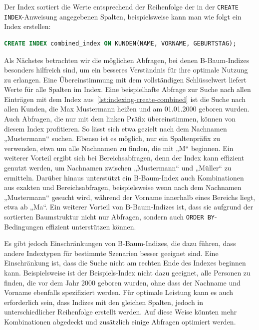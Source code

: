 Der Index sortiert die Werte entsprechend der Reihenfolge der in der \texttt{CREATE INDEX}-Anweisung angegebenen Spalten, beispielsweise kann man wie folgt ein Index erstellen:

\vspace{-5pt}
\begin{lstlisting}[language=SQL,caption=B-Baum-Index bestehend aus mehreren Attributen,label={lst:indexing-create-combined}]
CREATE INDEX combined_index ON KUNDEN(NAME, VORNAME, GEBURTSTAG);
\end{lstlisting}
\vspace{-8pt}

Als Nächstes betrachten wir die möglichen Abfragen, bei denen B-Baum-Indizes besonders hilfreich sind, um ein besseres Verständnis für ihre optimale Nutzung zu erlangen.
Eine Übereinstimmung mit dem vollständigen Schlüsselwert liefert Werte für alle Spalten im Index.
Eine beispielhafte Abfrage zur Suche nach allen Einträgen mit dem Index aus~\ref{lst:indexing-create-combined} ist die Suche nach allen Kunden, die Max Mustermann heißen und am 01.01.2000 geboren wurden.
Auch Abfragen, die nur mit dem linken Präfix übereinstimmen, können von diesem Index profitieren.
So lässt sich etwa gezielt nach dem Nachnamen „Mustermann“ suchen.
Ebenso ist es möglich, nur ein Spaltenpräfix zu verwenden, etwa um alle Nachnamen zu finden, die mit „M“ beginnen.
Ein weiterer Vorteil ergibt sich bei Bereichsabfragen, denn der Index kann effizient genutzt werden, um Nachnamen zwischen „Mustermann“ und „Müller“ zu ermitteln.
Darüber hinaus unterstützt ein B-Baum-Index auch Kombinationen aus exakten und Bereichsabfragen, beispielsweise wenn nach dem Nachnamen „Mustermann“ gesucht wird, während der Vorname innerhalb eines Bereichs liegt, etwa ab „Ma“.
Ein weiterer Vorteil von B-Baum-Indizes ist, dass sie aufgrund der sortierten Baumstruktur nicht nur Abfragen, sondern auch \texttt{ORDER BY}-Bedingungen effizient unterstützen können.

Es gibt jedoch Einschränkungen von B-Baum-Indizes, die dazu führen, dass andere Indextypen für bestimmte Szenarien besser geeignet sind.
Eine Einschränkung ist, dass die Suche nicht am rechten Ende des Indexes beginnen kann.
Beispielsweise ist der Beispiels-Index nicht dazu geeignet, alle Personen zu finden, die vor dem Jahr 2000 geboren wurden, ohne dass der Nachname und Vorname ebenfalls spezifiziert werden.
Für optimale Leistung kann es auch erforderlich sein, dass Indizes mit den gleichen Spalten, jedoch in unterschiedlicher Reihenfolge erstellt werden.
Auf diese Weise könnten mehr Kombinationen abgedeckt und zusätzlich einige Abfragen optimiert werden.

